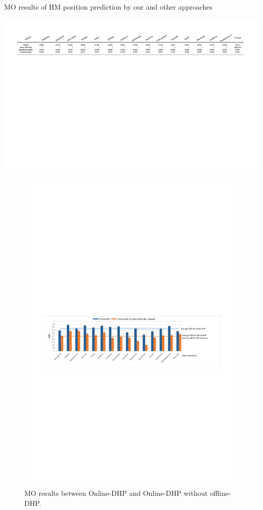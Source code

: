 \documentclass[10pt,journal,compsoc]{IEEEtran}
\begin{document}
\begin{table}
	\begin{center}
		\caption{MO results of HM position prediction by our and other approaches} \centerline{\includegraphics[width=2\columnwidth]{figures/experiment_on_line/Online_compare}}%
		\label{table-MeanMo}
	\end{center}
\end{table}

\begin{figure}
	\begin{center}
		\centerline{\includegraphics[width=2\columnwidth]{figures/experiment_on_line/Mean_MO}}%
		\caption{\footnotesize{MO results between Online-DHP and Online-DHP without offline-DHP.}}
		\label{Online_compare}
	\end{center}
\end{figure}
\end{document}
